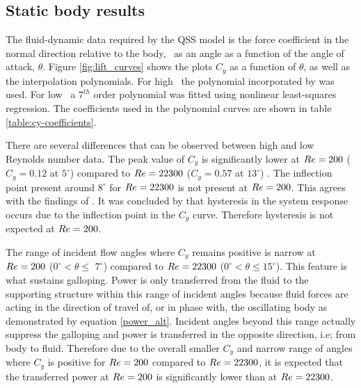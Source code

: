 \subsection{Static body results}

The fluid-dynamic data required by the QSS model is the force coefficient in the normal direction relative to the body, \cy\ as an angle as a function of the angle of attack, $\theta$. Figure \ref{fig:lift_curves} shows the plots $C_y$ as a function of $\theta$, as well as the interpolation polynomials. For high \reynoldsnumber\ the polynomial incorporated by \cite{Parkinson1964} was used. For low \reynoldsnumber\ a $7^{th}$ order polynomial was fitted using nonlinear least-squares regression. The coefficients used in the polynomial curves are shown in table \ref{table:cy-coefficients}.





There are several differences that can be observed between high and low Reynolds number data. The peak value of $C_y$ is  significantly lower at $Re=200$ ($C_y=0.12$ at $5^\circ$) compared to $Re=22300$ ($C_y=0.57$ at $13^\circ$) . The inflection point present around $8^\circ$ for $Re=22300$ is not present at $Re=200$. This agrees with the findings of \cite{Luo2003}.  It was concluded by \cite{Luo2003} that hysteresis in the system response occurs due to the inflection point in the $C_y$ curve. Therefore hysteresis is not expected at $Re=200$.

The range of incident flow angles where $C_y$ remains positive is narrow at $Re=200$ ($0^\circ <\theta \leq$ $7^\circ$) compared to $Re=22300$ ($0^\circ <\theta \leq 15^\circ$). This feature is what sustains galloping. Power is only transferred from the fluid to the supporting structure within this range of incident angles because fluid forces are acting in the direction of travel of, or in phase with, the oscillating body as demonstrated by equation \ref{power_alt}. Incident angles beyond this range actually suppress the galloping and power is transferred in the opposite direction, i.e; from body to fluid. Therefore due to the overall smaller $C_y$ and narrow range of angles where $C_y$ is positive for $Re=200$ compared to $Re=22300$, it is expected that the transferred power at $Re=200$ is significantly lower than at $Re=22300$.

